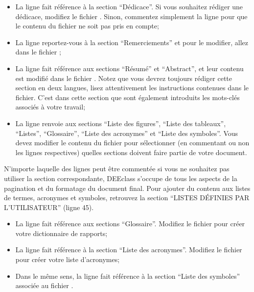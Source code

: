 \begin{itemize}
    \item La ligne \verb|| fait référence à la section ``Dédicace''. Si vous souhaitez rédiger une dédicace, modifiez le fichier . Sinon, commentez simplement la ligne pour que le contenu du fichier ne soit pas pris en compte;
    \item La ligne \verb|| reportez-vous à la section ``Remerciements'' et pour le modifier, allez dans le fichier ;
    \item La ligne \verb|| fait référence aux sections ``Résumé'' et ``Abstract'', et leur contenu est modifié dans le fichier . Notez que vous devrez toujours rédiger cette section en deux langues, lisez attentivement les instructions contenues dans le fichier. C'est dans cette section que sont également introduits les mots-clés associés à votre travail;
    \item La ligne \verb|| renvoie aux sections ``Liste des figures'', ``Liste des tableaux'', ``Listes'', ``Glossaire'', ``Liste des acronymes'' et ``Liste des symboles''. Vous devez modifier le contenu du fichier  pour sélectionner (en commentant ou non les lignes respectives) quelles sections doivent faire partie de votre document.
\end{itemize}

N'importe laquelle des lignes peut être commentée si vous ne souhaitez pas utiliser la section correspondante, DEEclass s'occupe de tous les aspects de la pagination et du formatage du document final. Pour ajouter du contenu aux listes de termes, acronymes et symboles, retrouvez la section ``LISTES DÉFINIES PAR L'UTILISATEUR'' (ligne 45).

\begin{itemize}
    \item La ligne \verb|| fait référence aux sections ``Glossaire''. Modifiez le fichier  pour créer votre dictionnaire de rapports;
    \item La ligne \verb|| fait référence à la section ``Liste des acronymes''. Modifiez le fichier  pour créer votre liste d'acronymes;
    \item Dans le même sens, la ligne \verb|| fait référence à la section ``Liste des symboles'' associée au fichier .
\end{itemize}


